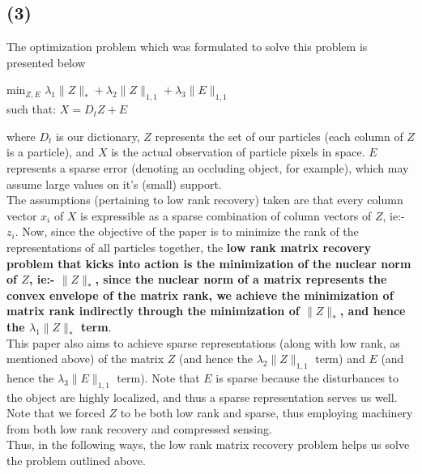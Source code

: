 \documentclass[a4paper,14pt]{article}
\numberwithin{definition}{section}
\numberwithin{mytheorem}{subsection}
\begin{document}
\subsection{(3)}
The optimization problem which was formulated to solve this problem is presented below
\begin{center}
    min$_{Z,E}$ $\lambda_1\lVert Z\rVert_* + \lambda_2\lVert Z\rVert_{1,1} + \lambda_3\lVert E\rVert_{1,1}$\\
    such that: $X = D_tZ + E$
\end{center}
where $D_t$ is our dictionary, $Z$ represents the set of our particles (each column of $Z$ is a particle), and $X$ is the actual observation of particle pixels in space. $E$ represents a sparse error (denoting an occluding object, for example), which may assume large values on it's (small) support.\\
The assumptions (pertaining to low rank recovery) taken are that every column vector $x_i$ of $X$ is expressible as a sparse combination of column vectors of $Z$, ie:- $z_i$. Now, since the objective of the paper is to minimize the rank of the representations of all particles together, the \textbf{low rank matrix recovery problem that kicks into action is the minimization of the nuclear norm of $Z$, ie:- $\lVert Z\rVert_*$, since the nuclear norm of a matrix represents the convex envelope of the matrix rank, we achieve the minimization of matrix rank indirectly through the minimization of $\lVert Z\rVert_*$, and hence the $\lambda_1\lVert Z\rVert_*$ term}.\\
This paper also aims to achieve sparse representations (along with low rank, as mentioned above) of the matrix $Z$ (and hence the $\lambda_2\lVert Z\rVert_{1,1}$ term) and $E$ (and hence the $\lambda_3\lVert E\rVert_{1,1}$ term). Note that $E$ is sparse because the disturbances to the object are highly localized, and thus a sparse representation serves us well. Note that we forced $Z$ to be both low rank and sparse, thus employing machinery from both low rank recovery and compressed sensing.\\
Thus, in the following ways, the low rank matrix recovery problem helps us solve the problem outlined above.
\end{document}
